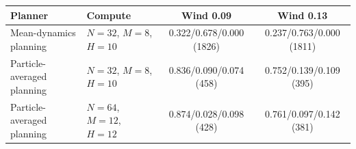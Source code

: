 \begin{tabular}{llcc}
\toprule
Planner & Compute & Wind 0.09 & Wind 0.13 \\
\midrule
Mean-dynamics planning & $N{=}32$, $M{=}8$, $H{=}10$ & 0.322/0.678/0.000 (1826) & 0.237/0.763/0.000 (1811) \\
Particle-averaged planning & $N{=}32$, $M{=}8$, $H{=}10$ & 0.836/0.090/0.074 (458) & 0.752/0.139/0.109 (395) \\
Particle-averaged planning & $N{=}64$, $M{=}12$, $H{=}12$ & 0.874/0.028/0.098 (428) & 0.761/0.097/0.142 (381) \\
\bottomrule
\end{tabular}
